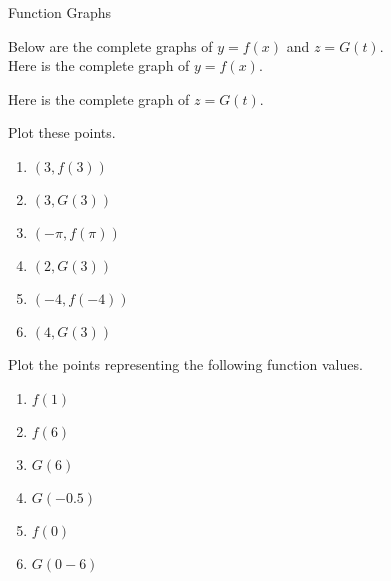 \documentclass{ximera}
\author{Lee Wayand}
\begin{document}
\begin{exercise}  Function Graphs  









Below are the complete graphs of $y = f(x)$ and $z = G(t)$.\\







Here is the complete graph of $y = f(x)$.\\


\begin{center}
\end{center}






Here is the complete graph of $z = G(t)$.\\


\begin{center}
\end{center}









\begin{question}  Plot these points. \\

\begin{enumerate}
  \item $(3, f(3))$ 
  \item $(3, G(3))$
  \item $(-\pi, f(\pi))$
  \item $(2, G(3))$
  \item $(-4, f(-4))$
  \item $(4, G(3))$
\end{enumerate}

\end{question}









\begin{question}  Plot the points representing the following function values. \\

\begin{enumerate}
  \item $f(1)$ 
  \item $f(6)$
  \item $G(6)$
  \item $G(-0.5)$
  \item $f(0)$
  \item $G(0-6)$
\end{enumerate}


\end{question}
\end{exercise}
\end{document}

